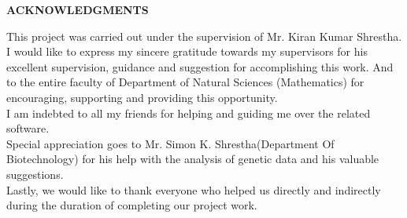 



\begin{center}
	{\Large{\bf{ACKNOWLEDGMENTS}}}\\
\end{center}


\noindent
This project was carried out under the supervision of Mr. Kiran Kumar Shrestha. I would like to express my sincere gratitude towards my supervisors for his excellent supervision, guidance and suggestion for accomplishing this work. And to the entire faculty of Department of Natural Sciences (Mathematics) for encouraging, supporting and providing this opportunity.\\

\noindent
I am indebted to all my friends for helping and guiding me over the related software. \\

\noindent
Special appreciation goes to Mr. Simon K. Shrestha(Department Of Biotechnology) for his help with the analysis of genetic data and his valuable suggestions. \\


\noindent
Lastly, we would like to thank everyone who helped us directly and indirectly during the duration of completing our project work.



